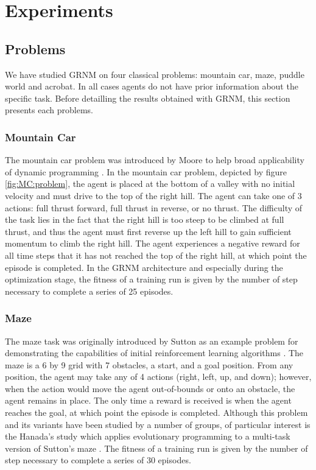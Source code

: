 \section{Experiments}


\subsection{Problems}

We have studied GRNM on four classical problems: mountain car, maze, puddle world and acrobat. In all cases agents do not have prior information about the specific task. Before detailling the results obtained with GRNM, this section presents each problems.
\subsubsection{Mountain Car}
The mountain car problem was introduced by Moore to help broad applicability of dynamic programming \cite{Moore1991}. In the mountain car problem, depicted by figure \ref{fig:MC:problem}, the agent is placed at the bottom of a valley with no initial velocity and must drive to the top of the right hill. The agent can take one of 3 actions: full thrust forward, full thrust in reverse, or no thrust. The difficulty of the task lies in the fact that the right hill is too steep to be climbed at full thrust, and thus the agent must first reverse up the left hill to gain sufficient momentum to climb the right hill. The agent experiences a negative reward for all time steps that it has not reached the top of the right hill, at which point the episode is completed. In the GRNM architecture and especially during the optimization stage, the fitness of a training run is given by the number of step necessary to complete a series of 25 episodes.

\subsubsection{Maze}

The maze task was originally introduced by Sutton as an example problem for demonstrating the capabilities of initial reinforcement learning algorithms \cite{Sutton1990}. The maze is a 6 by 9 grid with 7 obstacles, a start, and a goal position. From any position, the agent may take any of 4 actions (right, left, up, and down); however, when the action would move the agent out-of-bounds or onto an obstacle, the agent remains in place. The only time a reward is received is when the agent reaches the goal, at which point the episode is completed. Although this problem and its variants have been studied by a number of groups, of particular interest is the Hanada's study which applies evolutionary programming to a multi-task version of Sutton's maze \cite{Handa2007}. The fitness of a training run is given by the number of step necessary to complete a series of 30 episodes.

